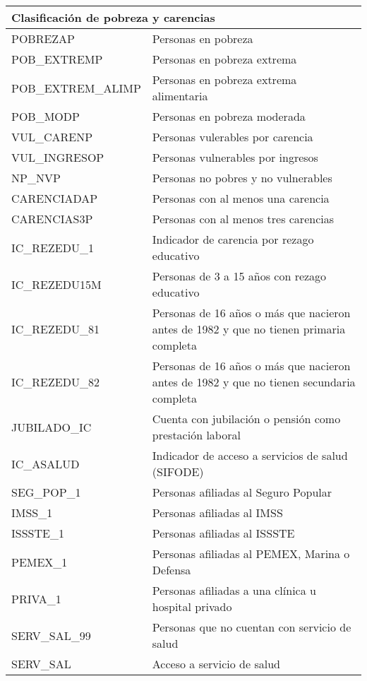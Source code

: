 \begin{longtable}{|p{8cm}|p{8cm}|}
    \hline
    \hline
    \multicolumn{2}{l}{Clasificación de pobreza y carencias}\\
    \hline
    POBREZAP & Personas en pobreza \\
    \hline
    POB\_EXTREMP & Personas en pobreza extrema \\
    \hline
    POB\_EXTREM\_ALIMP & Personas en pobreza extrema alimentaria \\
    \hline
    POB\_MODP & Personas en pobreza moderada \\
    \hline
    VUL\_CARENP & Personas vulerables por carencia \\
    \hline
    VUL\_INGRESOP & Personas vulnerables por ingresos \\
    \hline
    NP\_NVP & Personas no pobres y no vulnerables \\
    \hline
    CARENCIADAP & Personas con al menos una carencia \\
    \hline
    CARENCIAS3P & Personas con al menos tres carencias \\
    \hline
    IC\_REZEDU\_1 & Indicador de carencia por rezago educativo \\
    \hline
    IC\_REZEDU15M & Personas de 3 a 15 años con rezago educativo \\
    \hline
    IC\_REZEDU\_81 & Personas de 16 años o más que nacieron antes de 1982 y que no tienen primaria completa \\
    \hline
    IC\_REZEDU\_82 & Personas de 16 años o más que nacieron antes de 1982 y que no tienen secundaria completa \\
    \hline
    JUBILADO\_IC & Cuenta con jubilación o pensión como prestación laboral \\
    \hline
    IC\_ASALUD & Indicador de acceso a servicios de salud (SIFODE)\\
    \hline
    SEG\_POP\_1 & Personas afiliadas al Seguro Popular \\
    \hline
    IMSS\_1 & Personas afiliadas al IMSS \\
    \hline
    ISSSTE\_1 & Personas afiliadas al ISSSTE \\
    \hline
    PEMEX\_1 & Personas afiliadas al PEMEX, Marina o Defensa \\
    \hline
    PRIVA\_1 & Personas afiliadas a una clínica u hospital privado \\
    \hline
    SERV\_SAL\_99 & Personas que no cuentan con servicio de salud \\
    \hline
    SERV\_SAL & Acceso a servicio de salud \\

\end{longtable}
